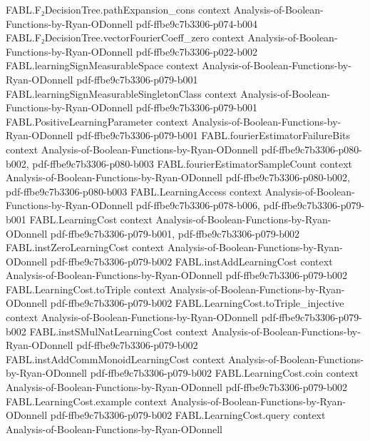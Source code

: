 \begin{theorem}
\proofstep
  {FABL.F₂DecisionTree.pathExpansion_cons}
  {context}
  {Analysis-of-Boolean-Functions-by-Ryan-ODonnell}
  {pdf-ffbe9c7b3306-p074-b004}
\proofstep
  {FABL.F₂DecisionTree.vectorFourierCoeff_zero}
  {context}
  {Analysis-of-Boolean-Functions-by-Ryan-ODonnell}
  {pdf-ffbe9c7b3306-p022-b002}
\proofstep
  {FABL.learningSignMeasurableSpace}
  {context}
  {Analysis-of-Boolean-Functions-by-Ryan-ODonnell}
  {pdf-ffbe9c7b3306-p079-b001}
\proofstep
  {FABL.learningSignMeasurableSingletonClass}
  {context}
  {Analysis-of-Boolean-Functions-by-Ryan-ODonnell}
  {pdf-ffbe9c7b3306-p079-b001}
\proofstep
  {FABL.PositiveLearningParameter}
  {context}
  {Analysis-of-Boolean-Functions-by-Ryan-ODonnell}
  {pdf-ffbe9c7b3306-p079-b001}
\proofstep
  {FABL.fourierEstimatorFailureBits}
  {context}
  {Analysis-of-Boolean-Functions-by-Ryan-ODonnell}
  {pdf-ffbe9c7b3306-p080-b002,
    pdf-ffbe9c7b3306-p080-b003}
\proofstep
  {FABL.fourierEstimatorSampleCount}
  {context}
  {Analysis-of-Boolean-Functions-by-Ryan-ODonnell}
  {pdf-ffbe9c7b3306-p080-b002,
    pdf-ffbe9c7b3306-p080-b003}
\proofstep
  {FABL.LearningAccess}
  {context}
  {Analysis-of-Boolean-Functions-by-Ryan-ODonnell}
  {pdf-ffbe9c7b3306-p078-b006,
    pdf-ffbe9c7b3306-p079-b001}
\proofstep
  {FABL.LearningCost}
  {context}
  {Analysis-of-Boolean-Functions-by-Ryan-ODonnell}
  {pdf-ffbe9c7b3306-p079-b001,
    pdf-ffbe9c7b3306-p079-b002}
\proofstep
  {FABL.instZeroLearningCost}
  {context}
  {Analysis-of-Boolean-Functions-by-Ryan-ODonnell}
  {pdf-ffbe9c7b3306-p079-b002}
\proofstep
  {FABL.instAddLearningCost}
  {context}
  {Analysis-of-Boolean-Functions-by-Ryan-ODonnell}
  {pdf-ffbe9c7b3306-p079-b002}
\proofstep
  {FABL.LearningCost.toTriple}
  {context}
  {Analysis-of-Boolean-Functions-by-Ryan-ODonnell}
  {pdf-ffbe9c7b3306-p079-b002}
\proofstep
  {FABL.LearningCost.toTriple_injective}
  {context}
  {Analysis-of-Boolean-Functions-by-Ryan-ODonnell}
  {pdf-ffbe9c7b3306-p079-b002}
\proofstep
  {FABL.instSMulNatLearningCost}
  {context}
  {Analysis-of-Boolean-Functions-by-Ryan-ODonnell}
  {pdf-ffbe9c7b3306-p079-b002}
\proofstep
  {FABL.instAddCommMonoidLearningCost}
  {context}
  {Analysis-of-Boolean-Functions-by-Ryan-ODonnell}
  {pdf-ffbe9c7b3306-p079-b002}
\proofstep
  {FABL.LearningCost.coin}
  {context}
  {Analysis-of-Boolean-Functions-by-Ryan-ODonnell}
  {pdf-ffbe9c7b3306-p079-b002}
\proofstep
  {FABL.LearningCost.example}
  {context}
  {Analysis-of-Boolean-Functions-by-Ryan-ODonnell}
  {pdf-ffbe9c7b3306-p079-b002}
\proofstep
  {FABL.LearningCost.query}
  {context}
  {Analysis-of-Boolean-Functions-by-Ryan-ODonnell}

\end{theorem}
